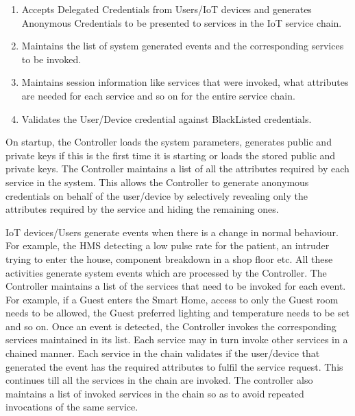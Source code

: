 \documentclass[journal]{IEEEtran}
\begin{document}
\begin{enumerate}[label=\alph*)]
	\item Accepts Delegated Credentials from Users/IoT devices and generates Anonymous Credentials to be presented to services in the IoT service chain.
	\item Maintains the list of system generated events and the corresponding services to be invoked.
	\item Maintains session information like services that were invoked, what attributes are needed for each service and so on for the entire service chain.
	\item Validates the User/Device credential against BlackListed credentials.
\end{enumerate}
On startup, the Controller loads the system parameters, generates public and private keys if this is the first time it is starting or loads the stored public and private keys. The Controller maintains a list of all the attributes required by each service in the system. This allows the Controller to generate anonymous credentials on behalf of the user/device by selectively revealing only the attributes required by the service and hiding the remaining ones. 

IoT devices/Users generate events when there is a change in normal behaviour. For example, the HMS detecting a low pulse rate for the patient, an intruder trying to enter the house, component breakdown in a shop floor etc. All these activities generate system events which are processed by the Controller. The Controller maintains a list of the services that need to be invoked for each event. For example, if a Guest enters the Smart Home, access to only the Guest room needs to be allowed, the Guest preferred lighting and temperature needs to be set and so on. Once an event is detected, the Controller invokes the corresponding services maintained in its list. Each service may in turn invoke other services in a chained manner. Each service in the chain validates if the user/device that generated the event has the required attributes to fulfil the service request. This continues till all the services in the chain are invoked. The controller also maintains a list of invoked services in the chain so as to avoid repeated invocations of the same service.
\end{document}
